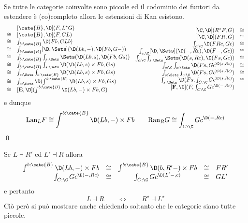 {\prop Se tutte le categorie coinvolte sono piccole ed il codominio dei funtori da estendere è (co)completo  allora le estensioni di Kan esistono.}
{\proof
\[\begin{array}{rl}
&[\cate{B},\D](F,L^\star G)
\\\cong&
[\cate{B},\D](F,GL)
\\\cong&
\int_{b:\cate{B}} \D(Fb,GLb)
\\\cong&
\int_{b:\cate{B}} [\D,\Sets](\D(Lb,-),\D(Fb,G-))
\\\cong&
\int_{b:\cate{B}}\int_{s:\Sets} \Sets(\D(Lb,s),\D(Fb,Gs))
\\\cong&
\int_{b:\cate{B}}\int_{s:\Sets} \D(\D(Lb,s)\times Fb,Gs)
\\\cong&
\int_{s:\Sets}\int_{b:\cate{B}} \D(\D(Lb,s)\times Fb,Gs)
\\\cong&
\int_{s:\Sets} \D(\int^{b:\cate{B}}\D(Lb,s)\times Fb,Gs)
\\\cong&
[{\mathbf E},\D](\int^{b:\cate{B}}\D(Lb,-)\times Fb,G)
\end{array}
\begin{array}{rl}
[\C,\D](R^\star F,G)
&\cong\\\null
[\C,\D](FR,G)
&\cong\\
\int_{c:\C} \D(FRc,Gc)
&\cong\\
\int_{c:\C} [\D,\Sets](\D(-,Rc),\D(F-,Gc))
&\cong\\
\int_{c:\C}\int_{s:\Sets} \Sets(\D(s,Rc),\D(Fs,Gc))
&\cong\\
\int_{c:\C}\int_{s:\Sets} \D(Fs,Gc^{\D(s,Rc)})
&\cong\\
\int_{s:\Sets}\int_{c:\C} \D(Fs,Gc^{\D(s,Rc)})
&\cong\\
\int_{s:\Sets} \D(Fs,\int_{C:\C}Gc^{\D(s,Rc)})
&\cong\\\null
[{\mathbf F},\D](F,\int_{C:\C}Gc^{\D(-,Rc)})
\end{array}\]
e dunque
\[
\text{Lan}_LF\cong \int^{b:\cate{B}}\D(Lb,-)\times Fb
\qquad 
\text{Ran}_RG\cong \int_{C:\C}Gc^{\D(-,Rc)}
\]
\qed}

{\oss Se $L\dashv R'$ ed $L'\dashv R$ allora
\[\begin{array}{rcccl}
\int^{b:\cate{B}}\D(Lb,-)\times Fb
&\cong&
\int^{b:\cate{B}}\D(b,R'-)\times Fb
&\cong&
FR'\\
\int_{C:\C}Gc^{\D(-,Rc)}
&\cong&
\int_{C:\C}Gc^{\D(L'-,c)}
&\cong&
GL'
\end{array}\]
e pertanto
\[L\dashv R \qquad\Leftrightarrow\qquad R^\star\dashv L^\star\]
Ciò però si può mostrare anche chiedendo soltanto che le categorie siano tutte piccole.
}